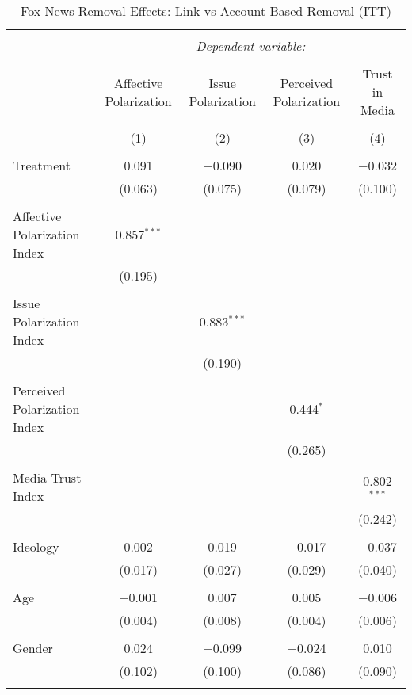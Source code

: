 
\begin{table}[!htbp] \centering 
  \caption{Fox News Removal Effects: Link vs Account Based Removal (ITT)} 
  \label{} 
\tiny 
\begin{tabular}{@{\extracolsep{5pt}}lcccc} 
\\[-1.8ex]\hline 
\hline \\[-1.8ex] 
 & \multicolumn{4}{c}{\textit{Dependent variable:}} \\ 
\cline{2-5} 
\\[-1.8ex] & Affective Polarization & Issue Polarization & Perceived Polarization & Trust in Media \\ 
\\[-1.8ex] & (1) & (2) & (3) & (4)\\ 
\hline \\[-1.8ex] 
 Treatment & 0.091 & $-$0.090 & 0.020 & $-$0.032 \\ 
  & (0.063) & (0.075) & (0.079) & (0.100) \\ 
  & & & & \\ 
 Affective Polarization Index & 0.857$^{***}$ &  &  &  \\ 
  & (0.195) &  &  &  \\ 
  & & & & \\ 
 Issue Polarization Index &  & 0.883$^{***}$ &  &  \\ 
  &  & (0.190) &  &  \\ 
  & & & & \\ 
 Perceived Polarization Index &  &  & 0.444$^{*}$ &  \\ 
  &  &  & (0.265) &  \\ 
  & & & & \\ 
 Media Trust Index &  &  &  & 0.802$^{***}$ \\ 
  &  &  &  & (0.242) \\ 
  & & & & \\ 
 Ideology & 0.002 & 0.019 & $-$0.017 & $-$0.037 \\ 
  & (0.017) & (0.027) & (0.029) & (0.040) \\ 
  & & & & \\ 
 Age & $-$0.001 & 0.007 & 0.005 & $-$0.006 \\ 
  & (0.004) & (0.008) & (0.004) & (0.006) \\ 
  & & & & \\ 
 Gender & 0.024 & $-$0.099 & $-$0.024 & 0.010 \\ 
  & (0.102) & (0.100) & (0.086) & (0.090) \\ 
  & & & & \\ 

\end{tabular}
\end{table}
